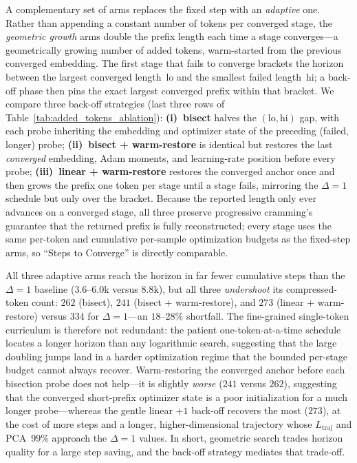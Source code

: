 A complementary set of arms replaces the fixed step with an \emph{adaptive} one. Rather than appending a constant number of tokens per converged stage, the \emph{geometric growth} arms double the prefix length each time a stage converges---a geometrically growing number of added tokens, warm-started from the previous converged embedding. The first stage that fails to converge brackets the horizon between the largest converged length~$\mathrm{lo}$ and the smallest failed length~$\mathrm{hi}$; a back-off phase then pins the exact largest converged prefix within that bracket. We compare three back-off strategies (last three rows of Table~\ref{tab:added_tokens_ablation}): \textbf{(i)~bisect} halves the $(\mathrm{lo}, \mathrm{hi})$ gap, with each probe inheriting the embedding and optimizer state of the preceding (failed, longer) probe; \textbf{(ii)~bisect + warm-restore} is identical but restores the last \emph{converged} embedding, Adam moments, and learning-rate position before every probe; \textbf{(iii)~linear + warm-restore} restores the converged anchor once and then grows the prefix one token per stage until a stage fails, mirroring the $\Delta = 1$ schedule but only over the bracket. Because the reported length only ever advances on a converged stage, all three preserve progressive cramming's guarantee that the returned prefix is fully reconstructed; every stage uses the same per-token and cumulative per-sample optimization budgets as the fixed-step arms, so ``Steps to Converge'' is directly comparable.

All three adaptive arms reach the horizon in far fewer cumulative steps than the $\Delta = 1$ baseline ($3.6$--$6.0$k versus $8.8$k), but all three \emph{undershoot} its compressed-token count: $262$ (bisect), $241$ (bisect + warm-restore), and $273$ (linear + warm-restore) versus $334$ for $\Delta = 1$---an $18$--$28\%$ shortfall. The fine-grained single-token curriculum is therefore not redundant: the patient one-token-at-a-time schedule locates a longer horizon than any logarithmic search, suggesting that the large doubling jumps land in a harder optimization regime that the bounded per-stage budget cannot always recover. Warm-restoring the converged anchor before each bisection probe does not help---it is slightly \emph{worse} ($241$ versus $262$), suggesting that the converged short-prefix optimizer state is a poor initialization for a much longer probe---whereas the gentle linear $+1$ back-off recovers the most ($273$), at the cost of more steps and a longer, higher-dimensional trajectory whose $L_{\text{traj}}$ and PCA~99\% approach the $\Delta = 1$ values. In short, geometric search trades horizon quality for a large step saving, and the back-off strategy mediates that trade-off.

